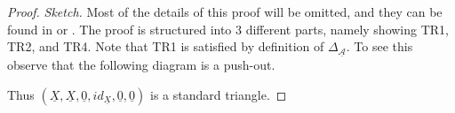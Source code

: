     \begin{proof}\emph{Sketch.}
        Most of the details of this proof will be omitted, and they can be found in \cite{happel} or \cite{May01}. The proof is structured into 3 different parts, namely showing TR1, TR2, and TR4. Note that TR1 is satisfied by definition of $\Delta_{\underline{\mathcal{A}}}$. To see this observe that the following diagram is a push-out.
        \begin{center}
        \end{center}
        Thus $(\underline{X},\underline{X},\underline{0},id_{\underline{X}},\underline{0},\underline{0})$ is a standard triangle.

        

\end{proof}
